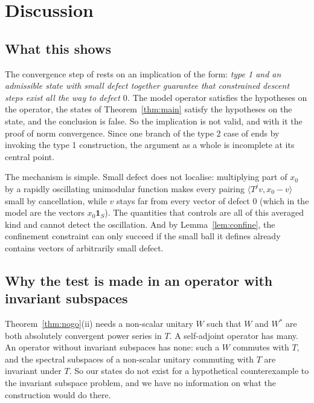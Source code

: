 \documentclass[11pt]{article}
\theoremstyle{definition}
\newcommand{\ip}[2]{\langle #1,#2\rangle}
\newcommand{\one}{\mathbf 1}
\begin{document}
\section{Discussion}\label{sec:discussion}

\subsection*{What this shows}
The convergence step of \cite{E} rests on an implication of the form: \emph{type 1 and an
admissible state with small defect together guarantee that constrained descent steps exist
all the way to defect $0$.} The model operator satisfies the hypotheses on the operator, the
states of Theorem~\ref{thm:main} satisfy the hypotheses on the state, and the conclusion is
false. So the implication is not valid, and with it the proof of norm convergence. Since one
branch of the type 2 case of \cite{E} ends by invoking the type 1 construction, the argument
as a whole is incomplete at its central point.

The mechanism is simple. Small defect does not localise: multiplying part of $x_0$ by a
rapidly oscillating unimodular function makes every pairing $\ip{T^jv}{x_0-v}$ small by
cancellation, while $v$ stays far from every vector of defect $0$ (which in the model are the
vectors $x_0\one_S$). The quantities that \cite{E} controls are all of this averaged kind
and cannot detect the oscillation. And by Lemma~\ref{lem:confine}, the confinement constraint
can only succeed if the small ball it defines already contains vectors of arbitrarily small
defect.

\subsection*{Why the test is made in an operator with invariant subspaces}
Theorem~\ref{thm:nogo}(ii) needs a non-scalar unitary $W$ such that $W$ and $W^*$ are both
absolutely convergent power series in $T$. A self-adjoint operator has many. An operator
without invariant subspaces has none: such a $W$ commutes with $T$, and the spectral
subspaces of a non-scalar unitary commuting with $T$ are invariant under $T$. So our
states do not exist for a hypothetical counterexample to the invariant subspace problem, and
we have no information on what the construction would do there.
\end{document}
